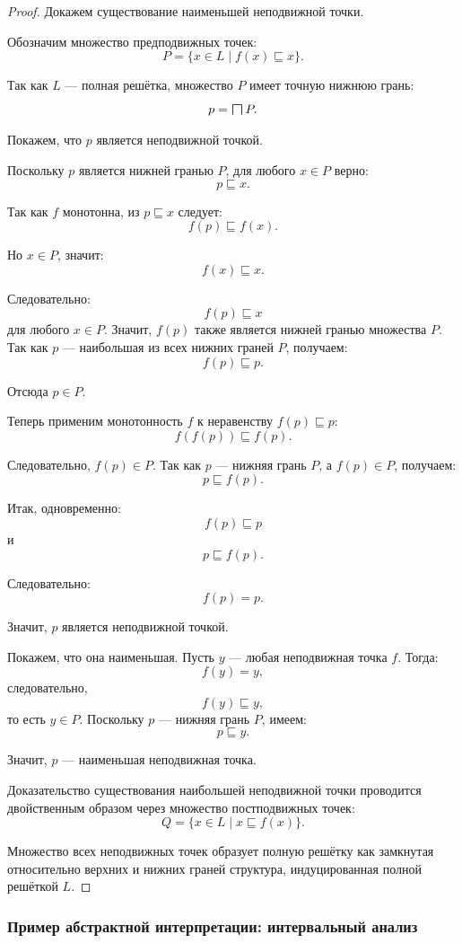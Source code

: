 \documentclass[12pt,a4paper]{article}
\newcommand{\BigSqcap}{\mathop{\mathchoice
  {\vcenter{\hbox{\Large$\sqcap$}}}
  {\vcenter{\hbox{\large$\sqcap$}}}
  {\vcenter{\hbox{\normalsize$\sqcap$}}}
  {\vcenter{\hbox{\small$\sqcap$}}}}\displaylimits}
\begin{document}
\begin{proof}
Докажем существование наименьшей неподвижной точки.

Обозначим множество предподвижных точек:
\[
P = \{x \in L \mid f(x) \sqsubseteq x\}.
\]

Так как $L$ --- полная решётка, множество $P$ имеет точную нижнюю грань:
\[
p = \BigSqcap P.
\]

Покажем, что $p$ является неподвижной точкой.

Поскольку $p$ является нижней гранью $P$, для любого $x \in P$ верно:
\[
p \sqsubseteq x.
\]

Так как $f$ монотонна, из $p \sqsubseteq x$ следует:
\[
f(p) \sqsubseteq f(x).
\]

Но $x \in P$, значит:
\[
f(x) \sqsubseteq x.
\]

Следовательно:
\[
f(p) \sqsubseteq x
\]
для любого $x \in P$. Значит, $f(p)$ также является нижней гранью множества $P$. Так как $p$ --- наибольшая из всех нижних граней $P$, получаем:
\[
f(p) \sqsubseteq p.
\]

Отсюда $p \in P$.

Теперь применим монотонность $f$ к неравенству $f(p) \sqsubseteq p$:
\[
f(f(p)) \sqsubseteq f(p).
\]

Следовательно, $f(p) \in P$. Так как $p$ --- нижняя грань $P$, а $f(p) \in P$, получаем:
\[
p \sqsubseteq f(p).
\]

Итак, одновременно:
\[
f(p) \sqsubseteq p
\]
и
\[
p \sqsubseteq f(p).
\]

Следовательно:
\[
f(p)=p.
\]

Значит, $p$ является неподвижной точкой.

Покажем, что она наименьшая. Пусть $y$ --- любая неподвижная точка $f$. Тогда:
\[
f(y)=y,
\]
следовательно,
\[
f(y) \sqsubseteq y,
\]
то есть $y \in P$. Поскольку $p$ --- нижняя грань $P$, имеем:
\[
p \sqsubseteq y.
\]

Значит, $p$ --- наименьшая неподвижная точка.

Доказательство существования наибольшей неподвижной точки проводится двойственным образом через множество постподвижных точек:
\[
Q=\{x \in L \mid x \sqsubseteq f(x)\}.
\]

Множество всех неподвижных точек образует полную решётку как замкнутая относительно верхних и нижних граней структура, индуцированная полной решёткой $L$.
\end{proof}

\subsubsection{Пример абстрактной интерпретации: интервальный анализ}
\end{document}
